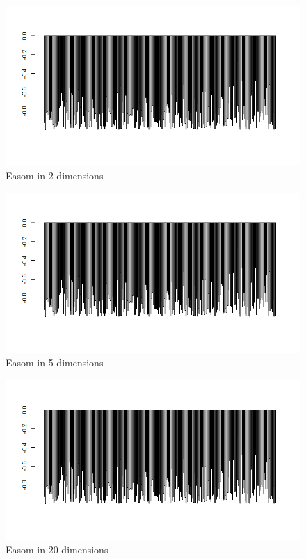 \documentclass{article}
\begin{document}
\begin{figure}[h!]
    \centering
    \includegraphics[width=1\textwidth]{./results/Easom2}
    \caption{Easom in 2 dimensions}
    \label{fig:Easom in 2 dimensions}
\end{figure}

\begin{figure}[h!]
    \centering
    \includegraphics[width=1\textwidth]{./results/Easom5}
    \caption{Easom in 5 dimensions}
    \label{fig:Easom in 5 dimensions}
\end{figure}

\begin{figure}[h!]
    \centering
    \includegraphics[width=1\textwidth]{./results/Easom20}
    \caption{Easom in 20 dimensions}
    \label{fig:Easom in 20 dimensions}
\end{figure}
\end{document}
